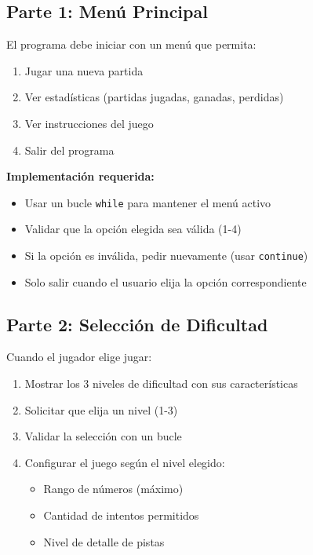 \documentclass[12pt,a4paper]{article}
\begin{document}
\subsection{Parte 1: Menú Principal}

El programa debe iniciar con un menú que permita:

\begin{enumerate}[leftmargin=*]
    \item Jugar una nueva partida
    \item Ver estadísticas (partidas jugadas, ganadas, perdidas)
    \item Ver instrucciones del juego
    \item Salir del programa
\end{enumerate}

\textbf{Implementación requerida:}
\begin{itemize}
    \item Usar un bucle \texttt{while} para mantener el menú activo
    \item Validar que la opción elegida sea válida (1-4)
    \item Si la opción es inválida, pedir nuevamente (usar \texttt{continue})
    \item Solo salir cuando el usuario elija la opción correspondiente
\end{itemize}

\subsection{Parte 2: Selección de Dificultad}

Cuando el jugador elige jugar:

\begin{enumerate}[leftmargin=*]
    \item Mostrar los 3 niveles de dificultad con sus características
    \item Solicitar que elija un nivel (1-3)
    \item Validar la selección con un bucle
    \item Configurar el juego según el nivel elegido:
    \begin{itemize}
        \item Rango de números (máximo)
        \item Cantidad de intentos permitidos
        \item Nivel de detalle de pistas
    \end{itemize}
\end{enumerate}
\end{document}
